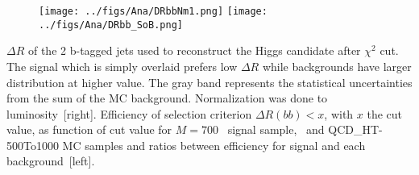 \begin{frame}{}
\vspace{-.2cm}

\begin{figure}[!Hhtbp]
  \begin{center}
    \texttt{[image: ../figs/Ana/DRbbNm1.png]}
    \texttt{[image: ../figs/Ana/DRbb\_SoB.png]}
  \end{center}
\end{figure}

\vspace{-.2cm}
    \begin{block}{}
      \tiny \centering $\Delta R$ of the 2 b-tagged jets used to reconstruct the Higgs candidate after $\chi^{2}$ cut. The signal which is simply overlaid prefers low $\Delta R$ while backgrounds have larger distribution at higher value. The gray band represents the statistical uncertainties from the sum of the MC background. Normalization was done to luminosity~[right]. Efficiency of selection criterion $\Delta R(bb)<x$, with $x$ the cut value, as function of cut value for $M=700$ \GeVcc~signal sample, \ttbar~and QCD\_HT-500To1000 MC samples and ratios between efficiency for signal and each background~[left].
    \end{block}

\end{frame}

